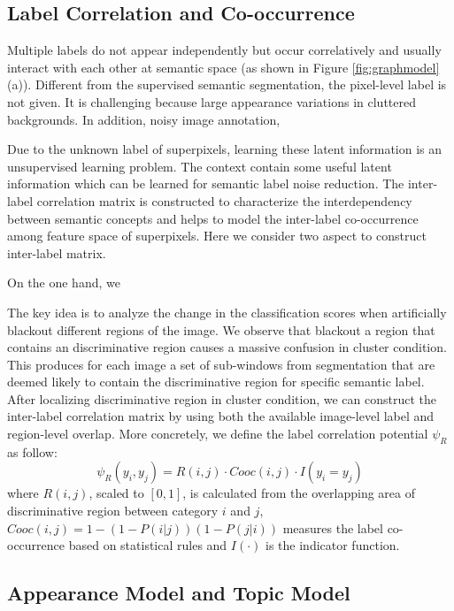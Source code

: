 \subsection{Label Correlation and Co-occurrence}
\label{sec:correlation}
Multiple labels do not appear independently but occur correlatively and usually interact with each other at semantic space (as shown in Figure \ref{fig:graphmodel} (a)). Different from the supervised semantic segmentation, the pixel-level label is not given. It is challenging because large appearance variations in cluttered backgrounds. In addition, noisy image annotation,

Due to the unknown label of superpixels, learning these latent information is an unsupervised learning problem. The context contain some useful latent information which can be learned for semantic label noise reduction. The inter-label correlation matrix is constructed to characterize the interdependency between semantic concepts and helps to model the inter-label co-occurrence among feature space of superpixels. Here we consider two aspect to construct inter-label matrix. 

On the one hand, we 

The key idea is to analyze the change in the classification scores when artificially blackout different regions of the image. We observe that blackout a region that contains an discriminative region causes a massive confusion in cluster condition. This produces for each image a set of sub-windows from segmentation that are deemed likely to contain the discriminative region for specific semantic label. After localizing discriminative region in cluster condition, we can construct the inter-label correlation matrix by using both the available image-level label and region-level overlap. More concretely, we define the label correlation potential $\psi_R$ as follow:
\begin{equation}
    \psi_{R}(y_i,y_j) = R(i,j) \cdot Cooc(i,j) \cdot I(y_i=y_j)
\end{equation}
where $R(i,j)$, scaled to $[0,1]$, is calculated from the overlapping area of discriminative region between category $i$ and $j$, $Cooc(i,j) = 1-(1-P(i|j))(1-P(j|i))$ measures the label co-occurrence based on statistical rules and $I(\cdot)$ is the indicator function.

\subsection{Appearance Model and Topic Model}

